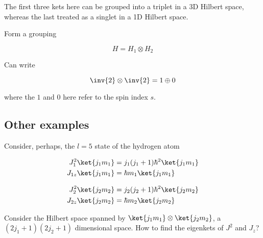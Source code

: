 The first three kets here can be grouped into a triplet in a 3D Hilbert space, whereas the last treated as a singlet in a 1D Hilbert space.

Form a grouping

\begin{equation}\label{eqn:qmTwoL16:550}
H = H_1 \otimes H_2
\end{equation}

Can write

\begin{equation}\label{eqn:qmTwoL16:570}
\inv{2} \otimes \inv{2} = 1 \oplus 0
\end{equation}

where the $1$ and $0$ here refer to the spin index $s$.

\subsection{Other examples}

Consider, perhaps, the $l=5$ state of the hydrogen atom

\begin{align}\label{eqn:qmTwoL16:590}
J_1^2 \ket{j_1 m_1} &= j_1(j_1+1)\hbar^2 \ket{j_1 m_1} \\
J_{1z} \ket{j_1 m_1} &= \hbar m_1 \ket{j_1 m_1} 
\end{align}

\begin{align}\label{eqn:qmTwoL16:610}
J_2^2 \ket{j_2 m_2} &= j_2(j_2+1)\hbar^2 \ket{j_2 m_2} \\
J_{2z} \ket{j_2 m_2} &= \hbar m_2 \ket{j_2 m_2} 
\end{align}

Consider the Hilbert space spanned by $\ket{j_1 m_1} \otimes \ket{j_2 m_2}$, a $(2 j_1 + 1)(2 j_2 + 1)$ dimensional space.  How to find the eigenkets of $J^2$ and $J_z$?

\EndArticle

